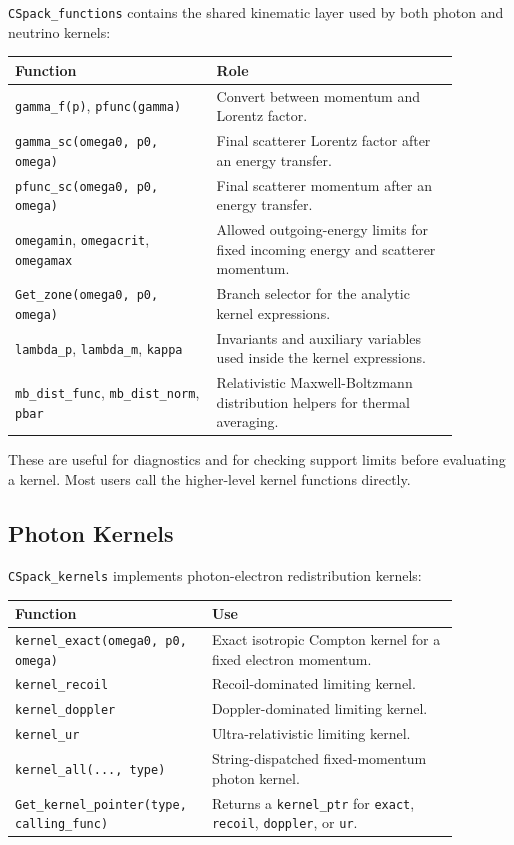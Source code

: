 \documentclass[11pt]{article}
\begin{document}
\texttt{CSpack\_functions} contains the shared kinematic layer used by both
photon and neutrino kernels:
\begin{center}
\small
\begin{tabular}{L{0.40\linewidth}L{0.48\linewidth}}
\toprule
Function & Role \\
\midrule
\texttt{gamma\_f(p)}, \texttt{pfunc(gamma)} & Convert between momentum and Lorentz factor. \\
\texttt{gamma\_sc(omega0, p0, omega)} & Final scatterer Lorentz factor after an energy transfer. \\
\texttt{pfunc\_sc(omega0, p0, omega)} & Final scatterer momentum after an energy transfer. \\
\texttt{omegamin}, \texttt{omegacrit}, \texttt{omegamax} & Allowed outgoing-energy limits for fixed incoming energy and scatterer momentum. \\
\texttt{Get\_zone(omega0, p0, omega)} & Branch selector for the analytic kernel expressions. \\
\texttt{lambda\_p}, \texttt{lambda\_m}, \texttt{kappa} & Invariants and auxiliary variables used inside the kernel expressions. \\
\texttt{mb\_dist\_func}, \texttt{mb\_dist\_norm}, \texttt{pbar} & Relativistic Maxwell-Boltzmann distribution helpers for thermal averaging. \\
\bottomrule
\end{tabular}
\end{center}

These are useful for diagnostics and for checking support limits before
evaluating a kernel. Most users call the higher-level kernel functions directly.

\subsection{Photon Kernels}

\texttt{CSpack\_kernels} implements photon-electron redistribution kernels:
\begin{center}
\small
\begin{tabular}{L{0.36\linewidth}L{0.52\linewidth}}
\toprule
Function & Use \\
\midrule
\texttt{kernel\_exact(omega0, p0, omega)} & Exact isotropic Compton kernel for a fixed electron momentum. \\
\texttt{kernel\_recoil} & Recoil-dominated limiting kernel. \\
\texttt{kernel\_doppler} & Doppler-dominated limiting kernel. \\
\texttt{kernel\_ur} & Ultra-relativistic limiting kernel. \\
\texttt{kernel\_all(..., type)} & String-dispatched fixed-momentum photon kernel. \\
\texttt{Get\_kernel\_pointer(type, calling\_func)} & Returns a \texttt{kernel\_ptr} for \texttt{exact}, \texttt{recoil}, \texttt{doppler}, or \texttt{ur}. \\
\bottomrule
\end{tabular}
\end{center}
\end{document}
